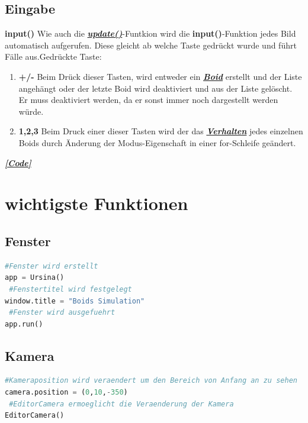 \documentclass[a4paper, hidelinks, 12pt]{article}
\begin{document}
\subsection{Eingabe}
\textbf{input()}\label{sec:input}
Wie auch die \hyperref[sec:update]{\textbf{\emph{update()}}}-Funtkion\cite{update} wird die \textbf{input()}-Funktion jedes Bild automatisch aufgerufen. Diese gleicht ab welche Taste gedrückt wurde und führt Fälle aus\cite{input}.\newline Gedrückte Taste: 

\begin{enumerate}
\item \textbf{+/-} Beim Drück dieser Tasten, wird entweder ein \hyperref[sec:Boid]{\textbf{\emph{Boid}}} erstellt und der Liste angehängt oder der letzte Boid wird deaktiviert und aus der Liste gelöscht. Er muss deaktiviert werden, da er sonst immer noch dargestellt werden würde.
\item \textbf{1,2,3} Beim Druck einer dieser Tasten wird der das \hyperref[sec:Verhalten]{\textbf{\emph{Verhalten}}} jedes einzelnen Boids durch Änderung der Modus-Eigenschaft in einer for-Schleife geändert.
	
\end{enumerate}
\hyperref[Codeinput]{\textbf{\emph{[Code]}}}


\newpage
\section{wichtigste Funktionen}
\subsection{Fenster}\label{CodeFenster}
\begin{lstlisting}[style=mystyle, language=Python]
 #Fenster wird erstellt
app = Ursina()
 #Fenstertitel wird festgelegt
window.title = "Boids Simulation"
 #Fenster wird ausgefuehrt
app.run()
\end{lstlisting}
\subsection{Kamera}\label{Kamera}
\begin{lstlisting}[style=mystyle, language=Python]
 #Kameraposition wird veraendert um den Bereich von Anfang an zu sehen
camera.position = (0,10,-350)
 #EditorCamera ermoeglicht die Veraenderung der Kamera
EditorCamera()
\end{lstlisting}
\end{document}
